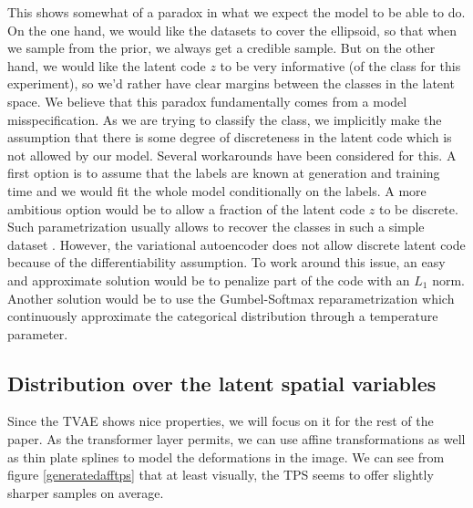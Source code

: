 \documentclass[letterpaper, twoside]{article}
\begin{document}
      This shows somewhat of a paradox in what we expect the model to be able to do. On the one hand, we would like the datasets to cover the ellipsoid, so that when we sample from the prior, we always get a credible sample. But on the other hand, we would like the latent code $z$ to be very informative (of the class for this experiment), so we'd rather have clear margins between the classes in the latent space. We believe that this paradox fundamentally comes from a model misspecification. As we are trying to  classify the class, we implicitly make the assumption that there is some degree of discreteness in the latent code which is not allowed by our model. Several workarounds have been considered for this. A first option is to assume that the labels are known at generation and training time and we would fit the whole model conditionally on the labels. A more ambitious option would be to allow a fraction of the latent code $z$ to be discrete. Such parametrization usually allows to recover the classes in such a simple dataset \cite{chen.infogan}. However, the variational autoencoder does not allow discrete latent code because of the differentiability assumption. To work around this issue, an easy and approximate solution would be to penalize part of the code with an $L_1$ norm. Another solution would be to use the Gumbel-Softmax reparametrization \cite{JangCatReparam} which continuously approximate the categorical distribution through a temperature parameter.

\subsection{Distribution over the latent spatial variables}

Since the TVAE shows nice properties, we will focus on it for the rest of the paper. As the transformer layer \cite{Jaderberg.stn} permits, we can use affine transformations as well as thin plate splines to model the deformations in the image. We can see from figure \ref{generatedafftps} that at least visually, the TPS seems to offer slightly sharper samples on average.\\
\end{document}
